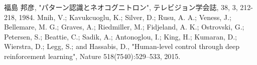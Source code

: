 \begin{thebibliography}{99}
        福島 邦彦, "パターン認識とネオコグニトロン", テレビジョン学会誌, 38, 3, 212-218, 1984.
        Mnih, V.; Kavukcuoglu, K.; Silver, D.; Rusu, A. A.; Veness, J.; Bellemare, M. G.; Graves, A.; Riedmiller, M.; Fidjeland, A. K.; Ostrovski, G.; Petersen, S.; Beattie, C.; Sadik, A.; Antonoglou, I.; King, H.; Kumaran, D.; Wierstra, D.; Legg, S.; and Hassabis, D., "Human-level control through deep reinforcement learning", Nature 518(7540):529–533, 2015.
\end{thebibliography}